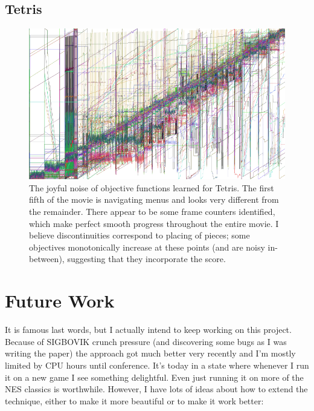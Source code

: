 \documentclass[twocolumn]{article}
\begin{document}
\subsection{Tetris}

\begin{figure}[ht]
\begin{center}
\includegraphics[width=0.95 \linewidth]{tetris}
\end{center}\vspace{-0.1in}
\caption{The joyful noise of objective functions learned for Tetris.
  The first fifth of the movie is navigating menus and looks very
  different from the remainder. There appear to be some frame counters
  identified, which make perfect smooth progress throughout the entire
  movie. I believe discontinuities correspond to placing of pieces;
  some objectives monotonically increase at these points (and are noisy
  in-between), suggesting that they incorporate the score.
}
\label{fig:tetris-objectives}
\end{figure}

\section{Future Work}

It is famous last words, but I actually intend to keep working on this
project. Because of SIGBOVIK crunch pressure (and discovering some
bugs as I was writing the paper) the approach got much better very
recently and I'm mostly limited by CPU hours until conference. It's
today in a state where whenever I run it on a new game I see something
delightful. Even just running it on more of the NES classics is
worthwhile. However, I have lots of ideas about how to extend the
technique, either to make it more beautiful or to make it work better:
\end{document}
